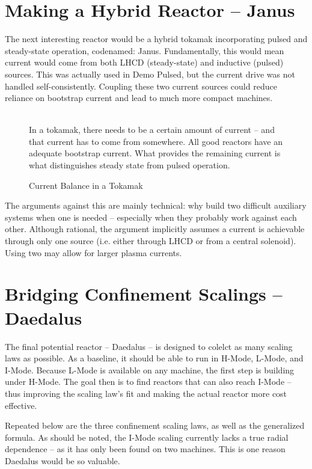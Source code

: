 \section{Making a Hybrid Reactor -- Janus}

The next interesting reactor would be a hybrid tokamak incorporating pulsed and steady-state operation, codenamed: Janus. Fundamentally, this would mean current would come from both LHCD (steady-state) and inductive (pulsed) sources. This was actually used in Demo Pulsed, but the current drive was not handled self-consistently. Coupling these two current sources could reduce reliance on bootstrap current and lead to much more compact machines.

\begin{figure}
	\centering
	\begin{adjustbox}{width=0.75\textwidth}
		
	\end{adjustbox}
	\caption{Current Balance in a Tokamak} ~\\
	\small In a tokamak, there needs to be a certain amount of current -- and that current has to come from somewhere. All good reactors have an adequate bootstrap current. What provides the remaining current is what distinguishes steady state from pulsed operation.
\end{figure}

The arguments against this are mainly technical: why build two difficult auxiliary systems when one is needed -- especially when they probably work against each other. Although rational, the argument implicitly assumes a current is achievable through only one source (i.e. either through LHCD or from a central solenoid). Using two may allow for larger plasma currents.

\section{Bridging Confinement Scalings -- Daedalus}

The final potential reactor -- Daedalus -- is designed to colelct as many scaling laws as possible. As a baseline, it should be able to run in H-Mode, L-Mode, and I-Mode. Because L-Mode is available on any machine, the first step is building under H-Mode. The goal then is to find reactors that can also reach I-Mode -- thus improving the scaling law's fit and making the  actual reactor more cost effective.

Repeated below are the three confinement scaling laws, as well as the generalized formula. As should be noted, the I-Mode scaling currently lacks a true radial dependence -- as it has only been found on two machines. This is one reason Daedalus would be so valuable.

